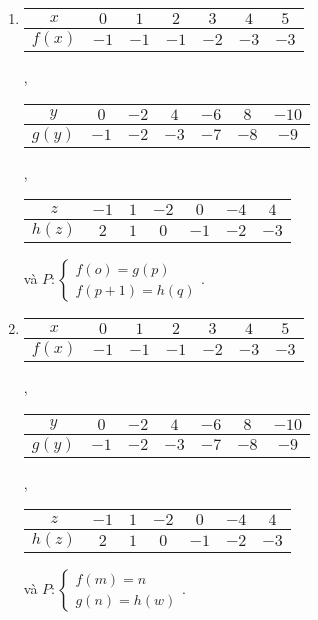 \begin{enumerate}
   \item
   \begin{tabular}{|c|c|c|c|c|c|c|}
      \hline
      $x$ & $0$ & $1$ & $2$ & $3$ & $4$ & $5$ \\
      \hline
      $f(x)$ & $-1$ & $-1$ & $-1$ & $-2$ & $-3$ & $-3$\\
      \hline
   \end{tabular},
   \begin{tabular}{|c|c|c|c|c|c|c|}
      \hline
      $y$ & $0$ & $-2$ & $4$ & $-6$ & $8$ & $-10$\\
      \hline
      $g(y)$ & $-1$ & $-2$ & $-3$ & $-7$ & $-8$ & $-9$\\
      \hline
   \end{tabular},

   \noindent\begin{tabular}{|c|c|c|c|c|c|c|}
      \hline
      $z$ & $-1$ & $1$ & $-2$ & $0$ & $-4$ & $4$\\
      \hline
      $h(z)$ & $2$ & $1$ & $0$ & $-1$ & $-2$ & $-3$\\
      \hline
   \end{tabular} và $P:\begin{cases}f(o) = g(p)\\f(p + 1) = h(q)\end{cases}$.

   \item
   \begin{tabular}{|c|c|c|c|c|c|c|}
      \hline
      $x$ & $0$ & $1$ & $2$ & $3$ & $4$ & $5$ \\
      \hline
      $f(x)$ & $-1$ & $-1$ & $-1$ & $-2$ & $-3$ & $-3$\\
      \hline
   \end{tabular},
   \begin{tabular}{|c|c|c|c|c|c|c|}
      \hline
      $y$ & $0$ & $-2$ & $4$ & $-6$ & $8$ & $-10$\\
      \hline
      $g(y)$ & $-1$ & $-2$ & $-3$ & $-7$ & $-8$ & $-9$\\
      \hline
   \end{tabular},

   \noindent\begin{tabular}{|c|c|c|c|c|c|c|}
      \hline
      $z$ & $-1$ & $1$ & $-2$ & $0$ & $-4$ & $4$\\
      \hline
      $h(z)$ & $2$ & $1$ & $0$ & $-1$ & $-2$ & $-3$\\
      \hline
   \end{tabular} và $P:\begin{cases}f(m) = n\\g(n) = h(w)\end{cases}$.
\end{enumerate}


